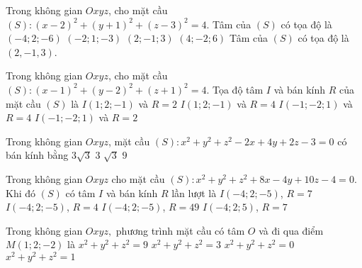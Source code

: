 \begin{ex}%
	Trong không gian $Oxyz$, cho mặt cầu $(S)\colon(x-2)^2+(y+1)^2+(z-3)^2=4$. Tâm của $(S)$ có tọa độ là
	\choice
	{$(-4;2;-6)$}
	{$(-2;1;-3)$}
	{\True $(2;-1;3)$}
	{$(4;-2;6)$}
	\loigiai
	{
	Tâm của $(S)$ có tọa độ là $(2,-1,3)$.
	}
\end{ex}

\begin{ex}%
	Trong không gian $Oxyz$, cho mặt cầu $(S)\colon(x-1)^{2}+(y-2)^{2}+(z+1)^{2}=4$. Tọa độ tâm $I$ và bán kính $R$ của mặt cầu $(S)$ là
	\choice
	{\True $I(1;2;-1)$ và $R=2$}
	{$I(1;2;-1)$ và $R=4$}
	{$I(-1;-2;1)$ và $R=4$}
	{$I(-1;-2;1)$ và $R=2$}
\end{ex}

\begin{ex}%
	Trong không gian $Oxyz$, mặt cầu $(S)\colon x^2+y^2+z^2-2x+4y+2z-3=0$ có bán kính bằng
	\choice
	{$3\sqrt{3}$}
	{\True $3$}
	{$\sqrt{3}$}
	{$9$}
\end{ex}

\begin{ex}%
	Trong không gian $Oxyz$ cho mặt cầu $(S)\colon x^2+y^2+z^2+8x-4y+10z-4=0$. Khi đó $(S)$ có tâm $I$ và bán kính $R$ lần lượt là
	\choice
	{\True $I(-4;2;-5)$, $R=7$}
	{$I(-4;2;-5)$, $R=4$}
	{$I(-4;2;-5)$, $R=49$}
	{$I(-4;2;5)$, $R=7$}
\end{ex}

%

\begin{ex}%
	Trong không gian $Oxyz,$ phương trình mặt cầu có tâm $O$ và đi qua điểm $M(1;2;-2)$ là
	\choice
	{\True $x^2 + y^2 + z^2 = 9$}
	{$x^2 + y^2 + z^2 = 3$}
	{$x^2 + y^2 + z^2 = 0$}
	{$x^2 + y^2 + z^2 = 1$}
\end{ex}

